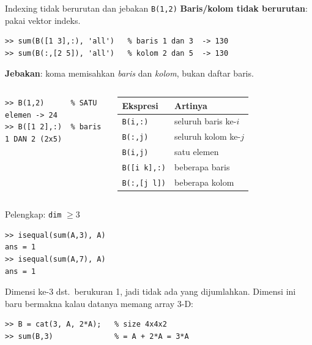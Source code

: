 \documentclass[aspectratio=169,11pt]{beamer}
\begin{document}
\begin{frame}[fragile]{Indexing tidak berurutan dan jebakan \texttt{B(1,2)}}
\textbf{Baris/kolom tidak berurutan}: pakai vektor indeks.
\begin{lstlisting}[basicstyle=\ttfamily\footnotesize]
>> sum(B([1 3],:), 'all')   % baris 1 dan 3  -> 130
>> sum(B(:,[2 5]), 'all')   % kolom 2 dan 5  -> 130
\end{lstlisting}
\textbf{Jebakan}: koma memisahkan \emph{baris} dan \emph{kolom}, bukan daftar baris.
\begin{columns}[T]
\begin{lstlisting}[basicstyle=\ttfamily\footnotesize]
>> B(1,2)      % SATU elemen -> 24
>> B([1 2],:)  % baris 1 DAN 2 (2x5)
\end{lstlisting}
\footnotesize
\renewcommand{\arraystretch}{1.1}
\begin{tabular}{l l}
\toprule
Ekspresi & Artinya \\
\midrule
\texttt{B(i,:)} & seluruh baris ke-$i$ \\
\texttt{B(:,j)} & seluruh kolom ke-$j$ \\
\texttt{B(i,j)} & satu elemen \\
\texttt{B([i k],:)} & beberapa baris \\
\texttt{B(:,[j l])} & beberapa kolom \\
\bottomrule
\end{tabular}
\end{columns}
\end{frame}

\begin{frame}[fragile]{Pelengkap: \texttt{dim} $\ge 3$}
\begin{lstlisting}
>> isequal(sum(A,3), A)
ans = 1
>> isequal(sum(A,7), A)
ans = 1
\end{lstlisting}
\small Dimensi ke-3 dst.\ berukuran 1, jadi tidak ada yang dijumlahkan.
Dimensi ini baru bermakna kalau datanya memang array 3-D:
\vspace{0.5em}
\begin{lstlisting}
>> B = cat(3, A, 2*A);   % size 4x4x2
>> sum(B,3)              % = A + 2*A = 3*A
\end{lstlisting}
\end{frame}
\end{document}
